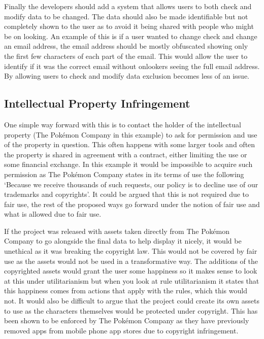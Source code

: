 \documentclass[a4paper]{article}
\newcommand{\Pokemon}{Pok\'{e}mon}
\begin{document}
\par
Finally the developers should add a system that allows users to both check and modify data to be changed.
The data should also be made identifiable but not completely shown to the user as to avoid it being shared with people who might be on looking.
An example of this is if a user wanted to change check and change an email address, the email address should be mostly obfuscated showing only the first few characters of each part of the email.
This would allow the user to identify if it was the correct email without onlookers seeing the full email address.
By allowing users to check and modify data exclusion becomes less of an issue.
\subsection{Intellectual Property Infringement}
One simple way forward with this is to contact the holder of the intellectual property (The \Pokemon{} Company in this example) to ask for permission and use of the property in question.
This often happens with some larger tools and often the property is shared in agreement with a contract, either limiting the use or some financial exchange.
In this example it would be impossible to acquire such permission as The \Pokemon{} Company states in its terms of use the following `Because we receive thousands of such requests, our policy is to decline use of our trademarks and copyrights'\cite{pokemonTOS}.
It could be argued that this is not required due to fair use, the rest of the proposed ways go forward under the notion of fair use and what is allowed due to fair use.
\\ \par
If the project was released with assets taken directly from The \Pokemon{} Company to go alongside the final data to help display it nicely, it would be unethical as it was breaking the copyright law.
This would not be covered by fair use as the assets would not be used in a transformative way.
The additions of the copyrighted assets would grant the user some happiness so it makes sense to look at this under utilitarianism but when you look at rule utilitarianism it states that this happiness comes from actions that apply with the rules, which this would not.
It would also be difficult to argue that the project could create its own assets to use as the characters themselves would be protected under copyright.
This has been shown to be enforced by The \Pokemon{} Company as they have previously removed apps from mobile phone app stores due to copyright infringement\cite{pokedexCopyright}.
\end{document}
